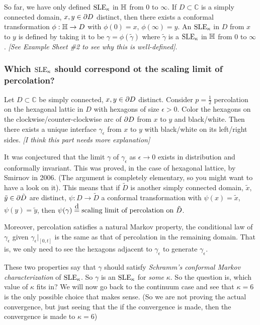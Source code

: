 \documentclass[12pt,a4paper]{article}
\newcommand\xeq{\stackrel{\mathclap{\normalfont\mbox{d}}}{=}}
\begin{document}
So far, we have only defined $\text{SLE}_{\kappa}$ in $\mathbb{H}$ from $0$ to $\infty$. If $D\subset \mathbb{C}$ is a simply connected domain, $x,y \in \partial D$ distinct, then there exists a conformal transformation $\phi : \mathbb{H} \rightarrow D$ with $\phi(0)=x$, $\phi(\infty) = y$. An $\text{SLE}_{\kappa}$ in $D$ from $x$ to $y$ is defined by taking it to be $\gamma = \phi(\tilde{\gamma})$ where $\tilde{\gamma}$ is a $\text{SLE}_{\kappa}$ in $\mathbb{H}$ from $0$ to $\infty$. \emph{[See Example Sheet \#2 to see why this is well-defined]}.

\subsubsection*{Which $\text{SLE}_{\kappa}$ should correspond ot the scaling limit of percolation?}

Let $D\subset \mathbb{C}$ be simply connected, $x, y \in \partial D$ distinct. Consider $p= \frac{1}{2}$ percolation on the hexagonal lattic in $D$ with hexagons of size $\epsilon >0$. Color the hexagons on the clockwise/counter-clockwise arc of $\partial D$ from $x$ to $y$ and black/white. Then there exists a unique interface $\gamma_{\epsilon}$ from $x$ to $y$ with black/white on its left/right sides. \emph{[I think this part needs more explanation]}

\quad It was conjectured that the limit $\gamma$ of $\gamma_{\epsilon}$ as $\epsilon \rightarrow 0$ exists in distribution and conformally invariant. This was proved, in the case of hexagonal lattice, by Smirnov in 2006. (The argument is completely elementary, so you might want to have a look on it). This means that if $\tilde{D}$ is another simply connected domain, $\tilde{x}$, $\tilde{y} \in \partial \tilde{D}$ are distinct, $\psi : D\rightarrow \tilde{D}$ a conformal transformation with $\psi(x) = \tilde{x}$, $\psi(y) = \tilde{y}$, then $\psi(\gamma) \xeq \text{scaling limit of percolation on } \tilde{D}$.  

\quad Moreover, percolation satisfies a natural Markov property, the conditional law of $\gamma_{\epsilon}$ given $\gamma_{\epsilon}|_{[0,t]}$ is the same as that of percolation in the remaining domain. That is, we only need to see the hexagons adjacent to $\gamma_{\epsilon}$ to generate $\gamma_{\epsilon}$.

\quad These two properties say that $\gamma$ should satisfy \emph{Schramm's conformal Markov characterization} of $\text{SLE}_{\kappa}$. So $\gamma$ is an $\text{SLE}_{\kappa}$ for \emph{some} $\kappa$. So the question is, which value of $\kappa$ fits in? We will now go back to the continuum case and see that $\kappa =6$ is the only possible choice that makes sense. (So we are not proving the actual convergence, but just seeing that the if the convergence is made, then the convergence is made to $\kappa=6$)
\s
\end{document}
